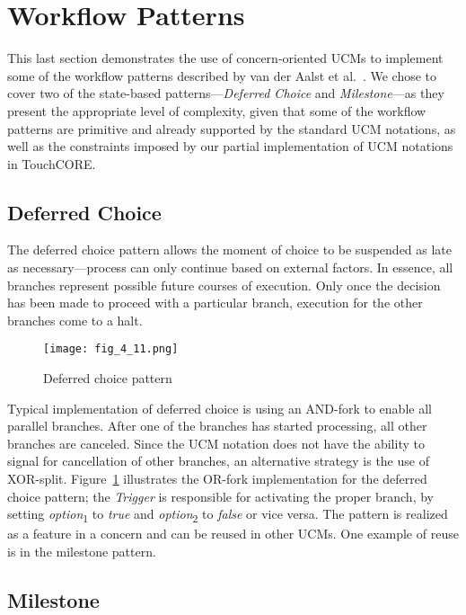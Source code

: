 \section{Workflow Patterns} \label{sec:4.3}

This last section demonstrates the use of concern-oriented UCMs to implement some of the workflow patterns described by van der Aalst et al.~\cite{van2003workflow}. We chose to cover two of the state-based patterns---\emph{Deferred Choice} and \emph{Milestone}---as they present the appropriate level of complexity, given that some of the workflow patterns are primitive and already supported by the standard UCM notations, as well as the constraints imposed by our partial implementation of UCM notations in TouchCORE.

\subsection{Deferred Choice}

The deferred choice pattern allows the moment of choice to be suspended as late as necessary---process can only continue based on external factors. In essence, all branches represent possible future courses of execution. Only once the decision has been made to proceed with a particular branch, execution for the other branches come to a halt. 

\begin{figure}[h]
	\centering
	\texttt{[image: fig\_4\_11.png]}
	\caption{Deferred choice pattern}
	\label{fig:4.11}
\end{figure}

Typical implementation of deferred choice is using an AND-fork to enable all parallel branches. After one of the branches has started processing, all other branches are canceled. Since the UCM notation does not have the ability to signal for cancellation of other branches, an alternative strategy is the use of XOR-split. Figure~\ref{fig:4.11} illustrates the OR-fork implementation for the deferred choice pattern; the \emph{Trigger} is responsible for activating the proper branch, by setting \emph{option}\textsubscript{1} to \emph{true} and \emph{option}\textsubscript{2} to \emph{false} or vice versa. The pattern is realized as a feature in a concern and can be reused in other UCMs. One example of reuse is in the milestone pattern.

\subsection{Milestone}

